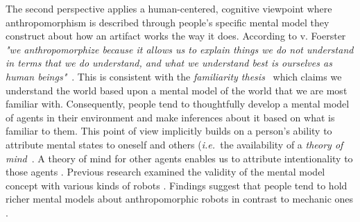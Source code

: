 \documentclass{acm_proc_article-sp}
\newcommand{\ie}{{\textit{i.e.~}}}
\begin{document}
The second perspective applies a human-centered, cognitive viewpoint where
anthropomorphism is described through people's specific mental model they
construct about how an artifact works the way it does. According to v.
Foerster  \textit{"we anthropomorphize because it allows us to
explain things we do not understand in terms that we do understand, and what we
understand best is ourselves as human beings"}~\cite{hegel_understanding_2008}.
This is consistent with the \emph{familiarity
thesis}~\cite{hegel_understanding_2008} which claims we understand the world
based upon a mental model of the world that we are most familiar with.
Consequently, people tend to thoughtfully develop a mental model of agents in
their environment and make inferences about it based on what is familiar to
them. This point of view implicitly builds on a person's ability to attribute
mental states to oneself and others (\ie the availability of a \emph{theory of
mind}~\cite{Premack1978}. A theory of  mind for other agents enables us to
attribute intentionality to those agents
\cite{leslie_pretense_1987,admoni_multi-category_2012}. Previous research
examined the validity of the mental model concept with various kinds of robots
\cite{schmitz_concepts_2011,kiesler_mental_2002}. Findings suggest that people
tend to hold richer mental models about anthropomorphic robots in contrast to
mechanic ones \cite{kiesler_mental_2002}.
\end{document}

